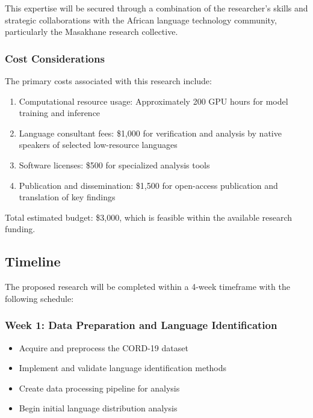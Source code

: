 \documentclass[
]{article}
\providecommand{\tightlist}{%
  \setlength{\itemsep}{0pt}\setlength{\parskip}{0pt}}\usepackage{longtable,booktabs,array}
\begin{document}
This expertise will be secured through a combination of the researcher's
skills and strategic collaborations with the African language technology
community, particularly the Masakhane research collective.

\subsubsection{Cost Considerations}\label{cost-considerations}

The primary costs associated with this research include:

\begin{enumerate}
\def\labelenumi{\arabic{enumi}.}
\tightlist
\item
  Computational resource usage: Approximately 200 GPU hours for model
  training and inference
\item
  Language consultant fees: \$1,000 for verification and analysis by
  native speakers of selected low-resource languages
\item
  Software licenses: \$500 for specialized analysis tools
\item
  Publication and dissemination: \$1,500 for open-access publication and
  translation of key findings
\end{enumerate}

Total estimated budget: \$3,000, which is feasible within the available
research funding.

\subsection{Timeline}\label{timeline}

The proposed research will be completed within a 4-week timeframe with
the following schedule:

\subsubsection{Week 1: Data Preparation and Language
Identification}\label{week-1-data-preparation-and-language-identification}

\begin{itemize}
\tightlist
\item
  Acquire and preprocess the CORD-19 dataset
\item
  Implement and validate language identification methods
\item
  Create data processing pipeline for analysis
\item
  Begin initial language distribution analysis
\end{itemize}
\end{document}
